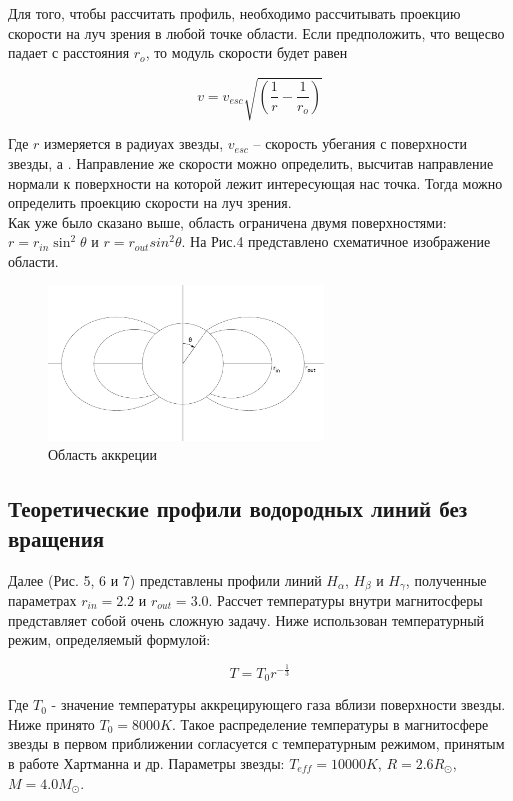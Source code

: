 \documentclass{article}
\begin{document}
Для того, чтобы рассчитать профиль, необходимо рассчитывать проекцию скорости на луч зрения в любой точке области. Если предположить, что вещесво падает с расстояния $r_o$, то модуль скорости будет равен

\[
v = v_{esc}\sqrt{\left(\frac{1}{r} - \frac{1}{r_o}\right)}
\]

Где $r$ измеряется в радиуах звезды, $v_{esc}$ -- скорость убегания с поверхности звезды, а .  Направление же скорости можно определить, высчитав направление нормали к поверхности на которой лежит интересующая нас точка. Тогда можно определить проекцию скорости на луч зрения. \\

Как уже было сказано выше, область ограничена двумя поверхностями: $r=r_{in}\sin^2 \theta$ и $r=r_{out}sin^2 \theta$. На Рис.4 представлено схематичное изображение области. 

\begin{figure} [h]
    \centering
    \includegraphics[width=0.65\textwidth]{accr}
    \caption{Область аккреции}
\end{figure}

\subsection{Теоретические профили водородных линий без вращения}
Далее (Рис. 5, 6 и 7) представлены профили линий $H_\alpha$, $H_\beta$ и $H_\gamma$, полученные параметрах $r_{in}=2.2$ и $r_{out}=3.0$. Рассчет температуры внутри магнитосферы представляет собой очень сложную задачу. Ниже использован температурный режим, определяемый формулой:  

\[
T = T_0 r^{-\frac{1}{3}}
\] 

Где $T_0$ - значение температуры аккрецирующего газа вблизи поверхности звезды. Ниже принято $T_0 = 8000 K$. Такое распределение температуры в магнитосфере звезды в первом приближении согласуется с температурным режимом, принятым в работе Хартманна и др. \cite{hartman94} Параметры звезды: $T_{eff}=10000K$, $R=2.6R_\odot$, $M=4.0M_\odot$. \\
\end{document}
